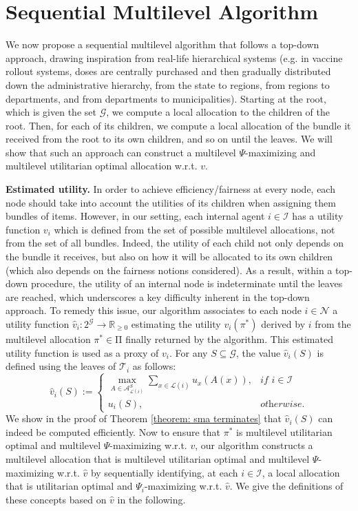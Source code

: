 \documentclass[]{article}
\newcommand{\tree}{\mathcal{T}}
\newcommand{\nodes}{\mathcal{N}}
\newcommand{\items}{\mathcal{G}}
\newcommand{\leaves}{\mathcal{L}}
\newcommand{\internal}{\mathcal{I}}
\newcommand{\mallocations}{\mathrm{\Pi}}
\newcommand{\allocations}{\mathcal{A}}
\begin{document}
\section{Sequential Multilevel Algorithm} \label{section: sma}

We now propose a sequential multilevel algorithm that follows a top-down approach, drawing inspiration from real-life hierarchical systems (e.g. in vaccine rollout systems, doses are centrally purchased and then gradually distributed down the administrative hierarchy, from the state to regions, from regions to departments, and from departments to municipalities). Starting at the root, which is given the set $\items$, we compute a local allocation to the children of the root. Then, for each of its children, we compute a local allocation of the bundle it received from the root to its own children, and so on until the leaves. We will show that such an approach can construct a multilevel $\Psi$-maximizing and multilevel utilitarian optimal allocation w.r.t. $v$. 

\medskip

\noindent \textbf{Estimated utility.} In order to achieve efficiency/fairness at every node, each node should take into account the utilities of its children when assigning them bundles of items. However, in our setting, each internal agent $i \in \internal$ has a utility function $v_i$ which is defined from the set of possible multilevel allocations, not from the set of all bundles. Indeed, the utility of each child not only depends on the bundle it receives, but also on how it will be allocated to its own children (which also depends on the fairness notions considered). As a result, within a top-down procedure, the utility of an internal node is indeterminate until the leaves are reached, which underscores a key difficulty inherent in the top-down approach. To remedy this issue, our algorithm associates to each node $i \in \nodes$ a utility function $\hat{v}_i : 2^\items \rightarrow \mathbb{R}_{\geq 0}$ estimating the utility $v_i(\pi^*)$ derived by $i$ from the multilevel allocation $\pi^* \in \mallocations$ finally returned by the algorithm. This estimated utility function is used as a proxy of $v_i$. For any $S \subseteq \items$, the value $\hat{v}_i(S)$ is defined using the leaves of $\tree_i$ as follows:
$$
\hat{v}_i(S) :=\left\{
  \begin{array}{ll}
    \max_{A \in \allocations^S_{\leaves(i)}} \sum_{x \in \leaves(i)} u_x(A(x)), & \textit{if } i \in \internal \\
    u_i(S), & \textit{otherwise}.
  \end{array}
\right.
$$
We show in the proof of Theorem \ref{theorem: sma terminates} that $\hat{v}_i(S)$ can indeed be computed efficiently. Now to ensure that $\pi^*$ is multilevel utilitarian optimal and multilevel $\Psi$-maximizing w.r.t. $v$, our algorithm constructs a multilevel allocation that is multilevel utilitarian optimal and multilevel $\Psi$-maximizing w.r.t. $\hat{v}$ by sequentially identifying, at each $i \in \internal$, a local allocation that is utilitarian optimal and $\Psi_i$-maximizing w.r.t. $\hat{v}$. We give the definitions of these concepts based on $\hat{v}$ in the following. 
\end{document}
